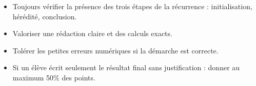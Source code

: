 \documentclass[12pt, a4paper]{article}
\begin{document}
\begin{tcolorbox}[title=Conseils pratiques]
\begin{itemize}
    \item Toujours vérifier la présence des trois étapes de la récurrence : initialisation, hérédité, conclusion.
    \item Valoriser une rédaction claire et des calculs exacts.
    \item Tolérer les petites erreurs numériques si la démarche est correcte.
    \item Si un élève écrit seulement le résultat final sans justification : donner au maximum 50\% des points.
\end{itemize}
\end{tcolorbox}

\vspace{0.5cm}
\end{document}
